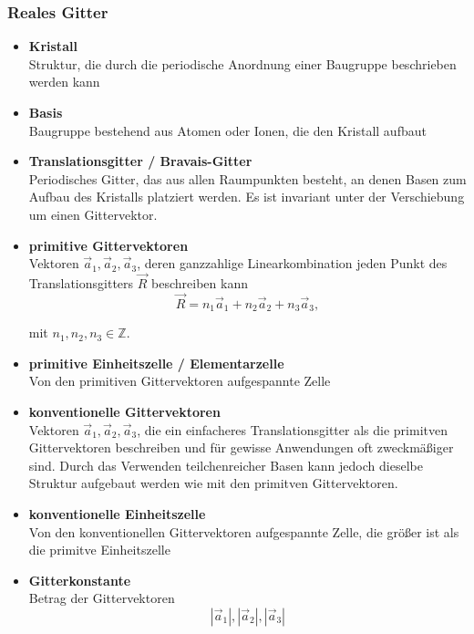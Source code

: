 \documentclass{article}
\begin{document}
\subsubsection{Reales Gitter}
	\begin{itemize}
		\item \textbf{Kristall}\\
		Struktur, die durch die periodische Anordnung einer Baugruppe beschrieben werden kann


		\item \textbf{Basis}\\
		Baugruppe bestehend aus Atomen oder Ionen, die den Kristall aufbaut
		
		
		\item \textbf{Translationsgitter / Bravais-Gitter}\\
		Periodisches Gitter, das aus allen Raumpunkten besteht, an denen Basen zum Aufbau des Kristalls platziert werden. Es ist invariant unter der Verschiebung um einen Gittervektor.


		\item \textbf{primitive Gittervektoren}\\
		Vektoren $\vec{a}_1, \vec{a}_2, \vec{a}_3$, deren ganzzahlige Linearkombination jeden Punkt des Translationsgitters $\vec{R}$ beschreiben kann
			\begin{equation}
				\vec{R} = n_1 \vec{a}_1 + n_2 \vec{a}_2 + n_3 \vec{a}_3,
			\end{equation}

		mit $n_1, n_2, n_3 \in \mathbb{Z}$.


		\item \textbf{primitive Einheitszelle / Elementarzelle}\\
		Von den primitiven Gittervektoren aufgespannte Zelle


		\item \textbf{konventionelle Gittervektoren}\\
		Vektoren $\vec{a}_1, \vec{a}_2, \vec{a}_3$, die ein einfacheres Translationsgitter als die primitven Gittervektoren beschreiben und für gewisse Anwendungen oft zweckmäßiger sind. Durch das Verwenden teilchenreicher Basen kann jedoch dieselbe Struktur aufgebaut werden wie mit den primitven Gittervektoren.


		\item \textbf{konventionelle Einheitszelle}\\
		Von den konventionellen Gittervektoren aufgespannte Zelle, die größer ist als die primitve Einheitszelle


		\item \textbf{Gitterkonstante}\\
		Betrag der Gittervektoren
			\begin{equation}
				|\vec{a}_1|, |\vec{a}_2|, |\vec{a}_3|
			\end{equation}
	\end{itemize}
\end{document}
